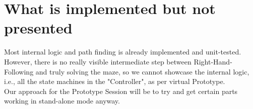 \documentclass[a4paper,parskip,headheight=38pt]{scrartcl} %
\begin{document}
\section{What is implemented but not presented}

Most internal logic and path finding is already implemented and
unit-tested.  However, there is no really visible intermediate step
between Right-Hand-Following and truly solving the maze, so we cannot
showcase the internal logic, i.e., all the state machines in the
"Controller", as per virtual Prototype.
 \\
Our approach for the Prototype Session will be to try and get certain
parts working in stand-alone mode anyway.
\end{document}
